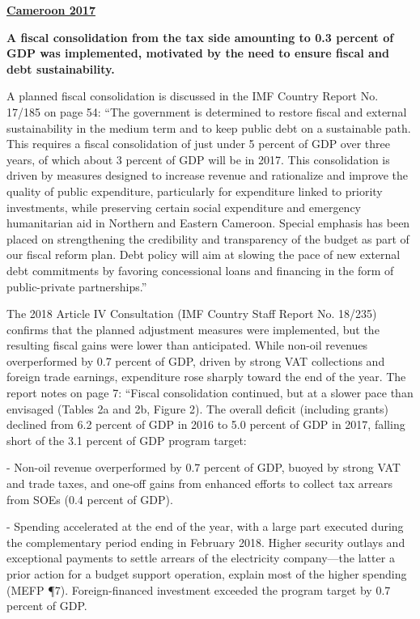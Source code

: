 \textbf{\underline{Cameroon 2017}}

\textbf{A fiscal consolidation from the tax side amounting to 0.3 percent of GDP was implemented, motivated by the need to ensure fiscal and debt sustainability.} 

A planned fiscal consolidation is discussed in the IMF Country Report No. 17/185 on page 54: “The government is determined to restore fiscal and external sustainability in the medium term and to keep public debt on a sustainable path. This requires a fiscal consolidation of just under 5 percent of GDP over three years, of which about 3 percent of GDP will be in 2017. This consolidation is driven by measures designed to increase revenue and rationalize and improve the quality of public expenditure, particularly for expenditure linked to priority investments, while preserving certain social expenditure and emergency humanitarian aid in Northern and Eastern Cameroon. Special emphasis has been placed on strengthening the credibility and transparency of the budget as part of our fiscal reform plan. Debt policy will aim at slowing the pace of new external debt commitments by favoring concessional loans and financing in the form of public-private partnerships.”

The 2018 Article IV Consultation (IMF Country Staff Report No. 18/235) confirms that the planned adjustment measures were implemented, but the resulting fiscal gains were lower than anticipated. While non-oil revenues overperformed by 0.7 percent of GDP, driven by strong VAT collections and foreign trade earnings, expenditure rose sharply toward the end of the year. The report notes on page 7: “Fiscal consolidation continued, but at a slower pace than envisaged (Tables 2a and 2b, Figure 2). The overall deficit (including grants) declined from 6.2 percent of GDP in 2016 to 5.0 percent of GDP in 2017, falling short of the 3.1 percent of GDP program target:

- Non-oil revenue overperformed by 0.7 percent of GDP, buoyed by strong VAT and trade taxes, and one-off gains from enhanced efforts to collect tax arrears from SOEs (0.4 percent of GDP).

- Spending accelerated at the end of the year, with a large part executed during the complementary period ending in February 2018. Higher security outlays and exceptional payments to settle arrears of the electricity company—the latter a prior action for a budget support operation, explain most of the higher spending (MEFP ¶7). Foreign-financed investment exceeded the program target by 0.7 percent of GDP.

